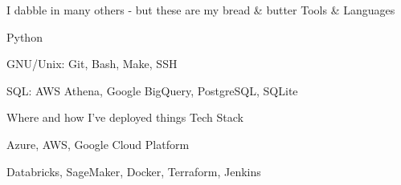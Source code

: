 
\begin{cventries}
  \cventry
    {I dabble in many others - but these are my bread \& butter}
    {Tools \& Languages}
    {}
    {}
    {
      \begin{cvitems}
        \item {Python}
        \item {GNU/Unix: Git, Bash, Make, SSH}
	\item {SQL: AWS Athena, Google BigQuery, PostgreSQL, SQLite}
      \end{cvitems}
    }

  \cventry
    {Where and how I've deployed things}
    {Tech Stack}
    {}
    {}
    {
      \begin{cvitems}
        \item {Azure, AWS, Google Cloud Platform}
        \item {Databricks, SageMaker, Docker, Terraform, Jenkins}
      \end{cvitems}
    }

\end{cventries}
